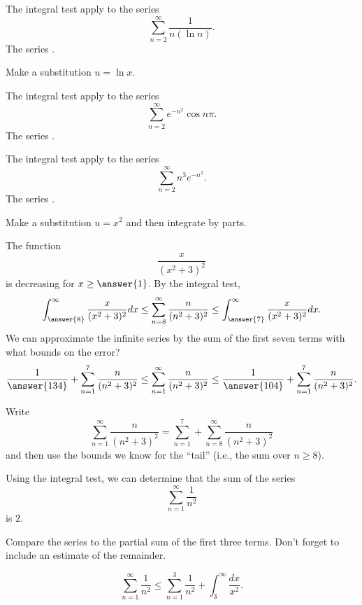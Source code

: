 \documentclass{ximera}
\begin{document}
\begin{exercise}
The integral test 
 apply to the series
\[ \sum_{n=2}^\infty \frac{1}{n (\ln n)}. \]
The series .
\begin{hint}
Make a substitution $u = \ln x$.
\end{hint}
\end{exercise}

\begin{exercise}
The integral test 
 apply to the series
\[ \sum_{n=2}^\infty e^{-n^2} \cos n \pi . \]
The series .
\end{exercise}

\begin{exercise}
The integral test 
 apply to the series
\[ \sum_{n=2}^\infty n^3 e^{-n^2}. \]
The series .
\begin{hint}
Make a substitution $u = x^2$ and then integrate by parts.
\end{hint}
\end{exercise}


\begin{exercise}
The function 
\[ \frac{x}{(x^2+3)^2} \]
is decreasing for $x \geq \answer{1}$.
By the integral test,  
\[ \int_{\answer{8}}^\infty \frac{x}{(x^2+3)^2} dx \leq \sum_{n=8}^\infty \frac{n}{(n^2+3)^2} \leq \int_{\answer{7}}^\infty \frac{x}{(x^2+3)^2} dx. \]
We can approximate the infinite series by the sum of the first seven terms with what bounds on the error?
\[ \frac{1}{\answer{134}} + \sum_{n=1}^7 \frac{n}{(n^2+3)^2} \leq \sum_{n=1}^\infty \frac{n}{(n^2+3)^2} \leq \frac{1}{\answer{104}} + \sum_{n=1}^7 \frac{n}{(n^2+3)^2}. \]
\begin{hint}
Write
\[ \sum_{n=1}^\infty \frac{n}{(n^2+3)^2} = \sum_{n=1}^7 + \sum_{n=8}^\infty \frac{n}{(n^2+3)^2}  \]
and then use the bounds we know for the ``tail'' (i.e., the sum over $n \geq 8$).
\end{hint}
\end{exercise}

\begin{exercise}
Using the integral test, we can determine that the sum of the series
\[ \sum_{n=1}^\infty \frac{1}{n^2} \]
is  $2$.
\begin{hint}
Compare the series to the partial sum of the first three terms. Don't forget to include an estimate of the remainder.
\begin{hint}
\[ \sum_{n=1}^\infty \frac{1}{n^2} \leq \sum_{n=1}^3 \frac{1}{n^2} + \int_{3}^\infty \frac{dx}{x^2}. \]
\end{hint}
\end{hint}
\end{exercise}
\end{document}
